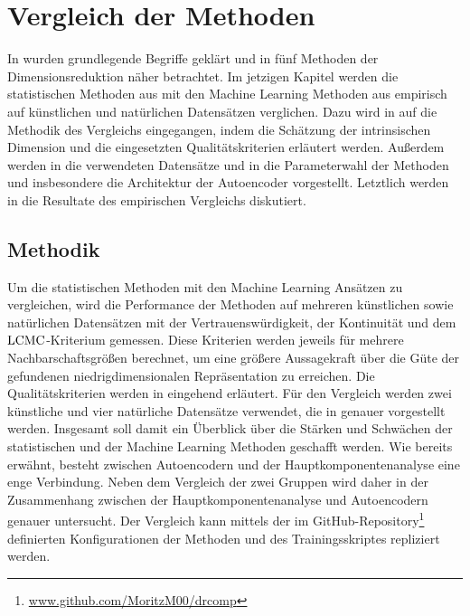 \chapter{Vergleich der Methoden}
\label{ch:Vergleich}

In  wurden grundlegende Begriffe geklärt und in
 fünf Methoden der Dimensionsreduktion näher betrachtet. Im jetzigen
Kapitel werden die statistischen Methoden aus  mit den
Machine Learning Methoden aus  empirisch auf künstlichen und
natürlichen Datensätzen verglichen. Dazu wird in  auf die
Methodik des Vergleichs eingegangen, indem die Schätzung der intrinsischen Dimension und die
eingesetzten Qualitätskriterien erläutert werden. Außerdem werden in
 die verwendeten Datensätze und in
 die Parameterwahl der Methoden und
insbesondere die Architektur der Autoencoder vorgestellt. Letztlich werden in
 die Resultate des empirischen Vergleichs diskutiert.

\section{Methodik}
\label{ch:Vergleich:sec:Methodik}

Um die statistischen Methoden mit den Machine Learning Ansätzen zu vergleichen, wird die
Performance der Methoden auf mehreren künstlichen sowie natürlichen Datensätzen mit der
Vertrauenswürdigkeit, der Kontinuität und dem $\operatorname{LCMC}$-Kriterium gemessen. Diese Kriterien werden
jeweils für mehrere Nachbarschaftsgrößen berechnet, um eine größere Aussagekraft über die Güte der
gefundenen niedrigdimensionalen Repräsentation zu erreichen. Die Qualitätskriterien werden in
 eingehend erläutert. Für den
Vergleich werden zwei künstliche und vier natürliche Datensätze verwendet, die in
 genauer vorgestellt werden. Insgesamt soll damit
ein Überblick über die Stärken und Schwächen der statistischen und der Machine Learning Methoden
geschafft werden. Wie bereits erwähnt, besteht zwischen Autoencodern und der
Hauptkomponentenanalyse eine enge Verbindung. Neben dem Vergleich der zwei Gruppen wird daher in
 der Zusammenhang zwischen der Hauptkomponentenanalyse
und Autoencodern genauer untersucht. Der Vergleich kann mittels der im
GitHub-Repository\footnote{\url{www.github.com/MoritzM00/drcomp}} definierten Konfigurationen der
Methoden und des Trainingsskriptes repliziert werden. 

